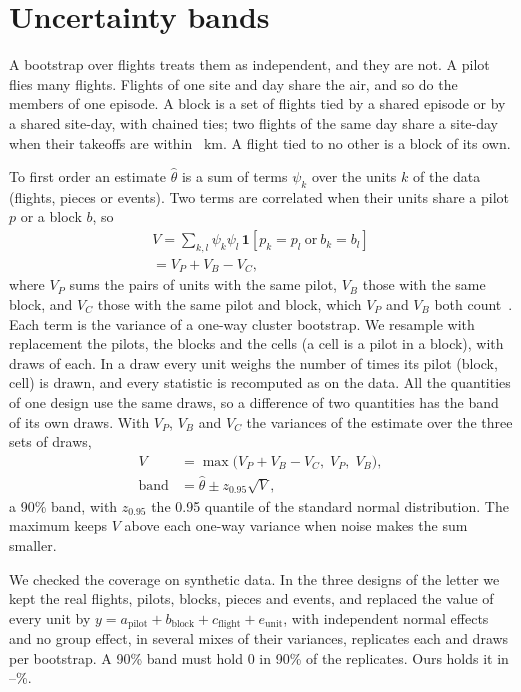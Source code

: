 \section{Uncertainty bands}\label{app:bands}

A bootstrap over flights treats them as independent, and they are not. A pilot flies many flights.
Flights of one site and day share the air, and so do the members of one episode. A block is a set
of flights tied by a shared episode or by a shared site-day, with chained ties; two flights of the
same day share a site-day when their takeoffs are within \LtSiteKm~km. A flight tied to no other is
a block of its own.

To first order an estimate $\hat\theta$ is a sum of terms $\psi_k$ over the units $k$ of the data
(flights, pieces or events). Two terms are correlated when their units share a pilot $p$ or
a block $b$, so
\begin{multline}
V=\sum_{k,l}\psi_k\psi_l\,\mathbf{1}[p_k=p_l\ \text{or}\ b_k=b_l]\\
=V_P+V_B-V_C ,
\end{multline}
where $V_P$ sums the pairs of units with the same pilot, $V_B$ those with the same block, and $V_C$
those with the same pilot and block, which $V_P$ and $V_B$ both count~\cite{Cameron2011}. Each term
is the variance of a one-way cluster bootstrap. We resample with replacement the pilots, the blocks
and the cells (a cell is a pilot in a block), with \NBoot{} draws of each. In a draw every unit
weighs the number of times its pilot (block, cell) is drawn, and every statistic is recomputed as on
the data. All the quantities of one design use the same draws, so a difference of two quantities has
the band of its own draws. With $V_P$, $V_B$ and $V_C$ the variances of the estimate over the three
sets of draws,
\begin{equation}
\begin{split}
V&=\max\bigl(V_P+V_B-V_C,\;V_P,\;V_B\bigr),\\
\text{band}&=\hat\theta\pm z_{0.95}\sqrt{V},
\end{split}
\end{equation}
a 90\% band, with $z_{0.95}$ the 0.95 quantile of the standard normal distribution. The maximum
keeps $V$ above each one-way variance when noise makes the sum smaller.

We checked the coverage on synthetic data. In the three designs of the letter we kept the real
flights, pilots, blocks, pieces and events, and replaced the value of every unit by
$y=a_\text{pilot}+b_\text{block}+c_\text{flight}+e_\text{unit}$, with independent normal effects and
no group effect, in several mixes of their variances, \CovReplicates{} replicates each and \CovDraws{}
draws per bootstrap. A 90\% band must hold 0 in 90\% of the replicates. Ours holds it in
\CovNewMin--\CovNewMax\%.
